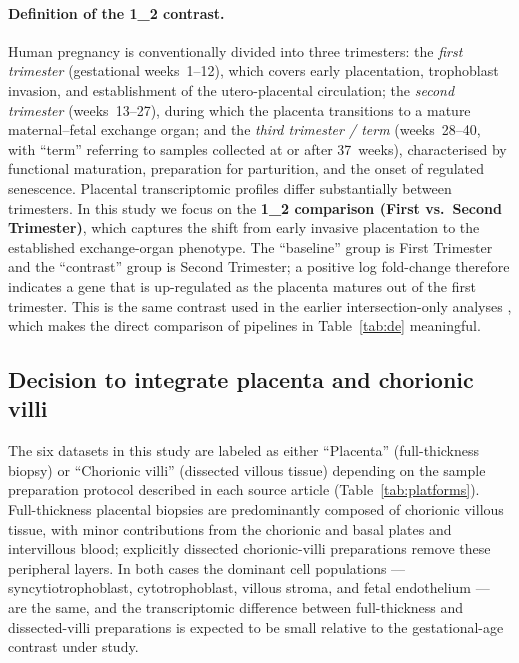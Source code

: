 \documentclass[11pt,a4paper]{article}
\begin{document}
\paragraph{Definition of the 1\_2 contrast.}
Human pregnancy is conventionally divided into three
trimesters: the \emph{first trimester} (gestational
weeks~1--12), which covers early placentation, trophoblast
invasion, and establishment of the utero-placental circulation;
the \emph{second trimester} (weeks~13--27), during which the
placenta transitions to a mature maternal--fetal exchange
organ; and the \emph{third trimester / term} (weeks~28--40,
with ``term'' referring to samples collected at or after
37~weeks), characterised by functional maturation, preparation
for parturition, and the onset of regulated senescence.
Placental transcriptomic profiles differ substantially between
trimesters. In
this study we focus on the \textbf{1\_2 comparison (First
vs.~Second Trimester)}, which captures the shift from early
invasive placentation to the established exchange-organ
phenotype. The ``baseline'' group is First Trimester and the
``contrast'' group is Second Trimester; a positive log
fold-change therefore indicates a gene that is up-regulated as
the placenta matures out of the first trimester. This is the
same contrast used in the earlier intersection-only analyses
\citep{Lykhenko2021a,Lykhenko2021b}, which makes the direct
comparison of pipelines in Table~\ref{tab:de} meaningful.

\subsection{Decision to integrate placenta and chorionic villi}
\label{sec:tissue}

The six datasets in this study are labeled as either
``Placenta'' (full-thickness biopsy) or ``Chorionic villi''
(dissected villous tissue) depending on the sample preparation
protocol described in each source article
(Table~\ref{tab:platforms}). Full-thickness placental biopsies
are predominantly composed of chorionic villous tissue, with
minor contributions from the chorionic and basal plates and
intervillous blood; explicitly dissected chorionic-villi
preparations remove these peripheral layers. In both cases the
dominant cell populations --- syncytiotrophoblast,
cytotrophoblast, villous stroma, and fetal endothelium ---
are the same, and the transcriptomic difference between
full-thickness and dissected-villi preparations is expected to
be small relative to the gestational-age contrast under study.
\end{document}
